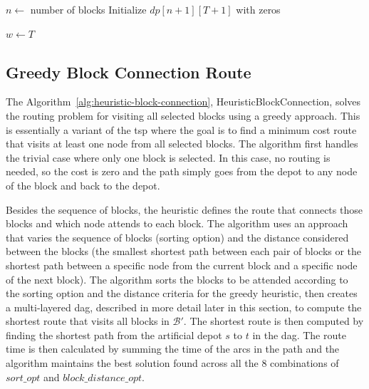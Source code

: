 \begin{algorithm}[h!]
	\caption{KnapsackSolve}
	\SetAlgoLined

	$n \leftarrow$ number of blocks\;
	Initialize $dp[n+1][T+1]$ with zeros\;


	$w \leftarrow T$\;

	\;
\end{algorithm}

\subsection{Greedy Block Connection Route}\label{sec:greedy-block-conn-route}

The Algorithm~\ref{alg:heuristic-block-connection}, HeuristicBlockConnection, solves the routing problem for visiting all selected blocks using a greedy approach. This is essentially a variant of the \gls{tsp} where the goal is to find a minimum cost route that visits at least one node from all selected blocks. The algorithm first handles the trivial case where only one block is selected. In this case, no routing is needed, so the cost is zero and the path simply goes from the depot to any node of the block and back to the depot.

Besides the sequence of blocks, the heuristic defines the route that connects those blocks and which node attends to each block. The algorithm uses an approach that varies the sequence of blocks (sorting option) and the distance considered between the blocks (the smallest shortest path between each pair of blocks or the shortest path between a specific node from the current block and a specific node of the next block). The algorithm sorts the blocks to be attended according to the sorting option and the distance criteria for the greedy heuristic, then creates a multi-layered \gls{dag}, described in more detail later in this section, to compute the shortest route that visits all blocks in $\mathcal{B}'$. The shortest route is then computed by finding the shortest path from the artificial depot $s$ to $t$ in the \gls{dag}. The route time is then calculated by summing the time of the arcs in the path and the algorithm maintains the best solution found across all the 8 combinations of $sort\_opt$ and $block\_distance\_opt$.

